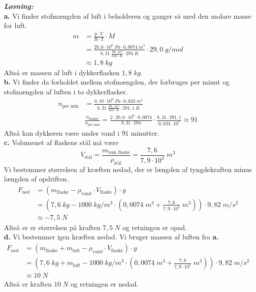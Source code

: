 \documentclass{report}
\newcommand{\sol}{\setlength{\parindent}{0cm}\textbf{\textit{Løsning:}}\setlength{\parindent}{1cm}}
\begin{document}
\sol \\
\textbf{a.}
Vi finder stofmængden af luft i beholderen og ganger så med den molare masse for luft.
\begin{equation*}
\begin{split}
  m&=\frac{p\cdot V}{R\cdot T} \cdot M \\ 
  &=\frac{20,6 \cdot 10^6 \;\unit{Pa} \cdot 0,0074 \;\unit{m^3} }{8,31 \;\unit{\frac{Pa \cdot m^3}{mol \cdot K}} \cdot 294 \;\unit{K} } \cdot 29,0 \;\unit{g/mol} \\ 
  &\approx 1,8 \;\unit{kg} 
\end{split}
\end{equation*}
Altså er massen af luft i dykkerflasken $1,8 \;\unit{kg} $. \\[1ex]
\textbf{b.}
Vi finder da forholdet mellem stofmængden, der forbruges per minut og stofmængden af luften i to dykkerflasker.
\begin{equation*}
\begin{split}
  n_{\text{per min} }&=\frac{0,10 \cdot 10^6 \;\unit{Pa} \cdot 0,033 \;\unit{m^3} }{8,31 \;\unit{\frac{Pa \cdot m^3}{mol \cdot K}} \cdot 291,1 \;\unit{K} }\\ 
  & \frac{n_{ \text{flasker} }}{n_{\text{per min}}}=\frac{2 \cdot 20,6 \cdot 10^6 \cdot 0,0074}{8,31 \cdot 294}\cdot \frac{8,31 \cdot 291,1}{0,033 \cdot 10^5} \approx 91
\end{split}
\end{equation*}
Altså kan dykkeren være under vand i $91$ minutter. \\[1ex]
\textbf{c.}
Volumenet af flaskens stål må være
\[
V_{\text{stål} }=\frac{m_{\text{tom flaske} }}{\rho_{\text{stål} }}= \frac{7,6 }{7,9\cdot 10^3} \;\unit{m^3} 
\] 
Vi bestemmer størrelsen af kræften nedad, der er længden af tyngdekraften minus længden af opdriften.
\begin{equation*}
\begin{split}
  F_{\text{ned} }&=\left(m_{\text{flaske}}- \rho_{\text{vand} } \cdot V_{\text{flaske} }\right) \cdot g \\ 
  &=\left(7,6 \;\unit{kg} - 1000 \;\unit{kg/m^3} \cdot \left(0,0074 \;\unit{m^3} +\frac{7,6}{7,9 \cdot 10^3} \;\unit{m^3} \right)\right) \cdot 9,82 \;\unit{m/s^2} \\ 
  &\approx -7,5 \;\unit{N} 
\end{split}
\end{equation*}
Altså er er størrelsen på kraften $7,5 \;\unit{N} $ og retningen er opad. \\[1ex]
\textbf{d.}
Vi bestemmer igen kræften nedad. 
Vi bruger massen af luften fra \textbf{a.}
\begin{equation*}
\begin{split}
  F_{\text{ned}} &=\left(m_{\text{flaske}}+m_{\text{luft} }- \rho_{\text{vand} } \cdot V_{\text{flaske} }\right) \cdot g \\ 
  &= \left(7,6 \;\unit{kg} + m_{\text{luft} }- 1000 \;\unit{kg/m^3} \cdot \left(0,0074 \;\unit{m^3} +\frac{7,6}{7,9 \cdot 10^3} \;\unit{m^3} \right)\right) \cdot 9,82 \;\unit{m/s^2} \\ 
  &\approx 10 \;\unit{N} 
\end{split}
\end{equation*}
Altså er kraften $10 \;\unit{N} $ og retningen er nedad. 
\end{document}
